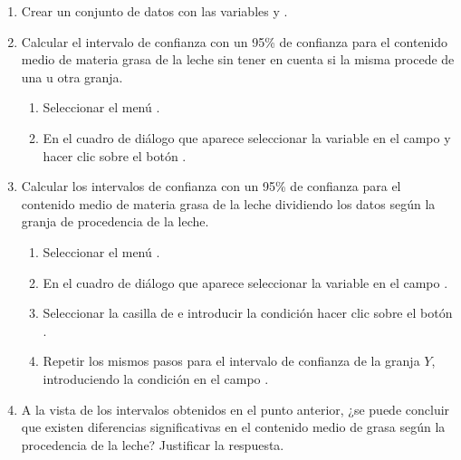\begin{enumerate}[leftmargin=*]
\begin{enumerate}
\item Crear un conjunto de datos con las variables  y .
\item Calcular el intervalo de confianza con un 95\% de confianza para el contenido medio de materia grasa de la leche
sin tener en cuenta si la misma procede de una u otra granja.
\begin{indicacion}{
\begin{enumerate}
\item Seleccionar el menú .
\item En el cuadro de diálogo que aparece seleccionar la variable  en el campo  y hacer
clic sobre el botón .
\end{enumerate}
}
\end{indicacion}

\item Calcular los intervalos de confianza con un 95\% de confianza para el contenido medio de materia grasa de la leche
dividiendo los datos según la granja de procedencia de la leche. 
\begin{indicacion}{
\begin{enumerate}
\item Seleccionar el menú .
\item En el cuadro de diálogo que aparece seleccionar la variable  en el campo .
\item Seleccionar la casilla de  e introducir la condición  hacer
clic sobre el botón .
\item Repetir los mismos pasos para el intervalo de confianza de la granja $Y$, introduciendo la condición
 en el campo .
\end{enumerate}
}
\end{indicacion}

\item A la vista de los intervalos obtenidos en el punto anterior, ¿se puede concluir que existen diferencias
significativas en el contenido medio de grasa según la procedencia de la leche? Justificar la respuesta.
\end{enumerate}



\end{enumerate}
